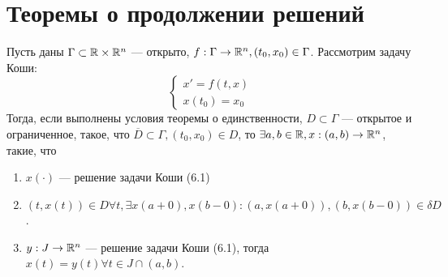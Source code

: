 

\section{Теоремы о продолжении решений}

\begin{theorem}
    Пусть даны \(\Gamma \subset \mathbb{R} \times \mathbb{R}^n\) --- открыто, \(f: \Gamma \rightarrow \mathbb{R}^n, (t_0, x_0) \in \Gamma\). Рассмотрим задачу Коши:
    \begin{equation}
        \begin{cases}
            x' = f(t, x) \\
            x(t_0) = x_0
        \end{cases}
    \end{equation}
    Тогда, если выполнены условия теоремы о единственности, \(D \subset \Gamma\) --- открытое и ограниченное, такое, что \(\overline{D} \subset \Gamma, (t_0, x_0) \in D\), то \(\exists a, b \in \mathbb{R}, x: (a, b) \rightarrow \mathbb{R}^n\), такие, что
    \begin{enumerate}
        \item \(x(\cdot)\) --- решение задачи Коши (6.1)
        \item \((t, x(t)) \in D \forall t, \exists x(a + 0), x(b - 0): (a, x(a + 0)), (b, x(b - 0)) \in \delta D\).
        \item \(y: J \rightarrow \mathbb{R}^n\) --- решение задачи Коши (6.1), тогда \(x(t) = y(t) \forall t \in J \cap (a, b)\).
    \end{enumerate}
\end{theorem}
